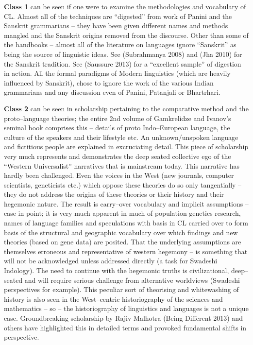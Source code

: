 \textbf{Class 1} can be seen if one were to examine the methodologies and vocabulary of CL. Almost all of the techniques are “digested” from work of Panini and the Sanskrit grammarians – they have been given different names and methods mangled and the Sanskrit origins removed from the discourse. Other than some of the handbooks – almost all of the literature on languages ignore “Sanskrit” as being the source of linguistic ideas. See (Subrahmanya 2008) and (Jha 2010) for the Sanskrit tradition. See (Saussure 2013) for a “excellent sample” of digestion in action. All the formal paradigms of Modern linguistics (which are heavily influenced by Sanskrit), chose to ignore the work of the various Indian grammarians and any discussion even of Panini, Patanjali or Bhartrhari.

\textbf{Class 2} can be seen in scholarship pertaining to the comparative method and the proto–language theories; the entire 2nd volume of Gamkrelidze and Ivanov’s seminal book comprises this – details of proto Indo–European language, the culture of the speakers and their lifestyle etc. An unknown/unspoken language and fictitious people are explained in excruciating detail. This piece of scholarship very much represents and demonstrates the deep seated collective ego of the “Western Universalist” narratives that is mainstream today. This narrative has hardly been challenged. Even the voices in the West (new journals, computer scientists, geneticists etc.) which oppose these theories do so only tangentially – they do not address the origins of these theories or their history and their hegemonic nature. The result is carry–over vocabulary and implicit assumptions – case in point; it is very much apparent in much of population genetics research, names of language families and speculations with basis in CL carried over to form basis of the structural and geographic vocabulary over which findings and new theories (based on gene data) are posited. That the underlying assumptions are themselves erroneous and representative of western hegemony – is something that will not be acknowledged unless addressed directly (a task for Swadeshi Indology). The need to continue with the hegemonic truths is civilizational, deep–seated and will require serious challenge from alternative worldviews (Swadeshi perspectives for example). This peculiar sort of theorising and whitewashing of history is also seen in the West–centric historiography of the sciences and mathematics – so – the historiography of linguistics and languages is not a unique case. Groundbreaking scholarship by Rajiv Malhotra (Being Different 2013) and others have highlighted this in detailed terms and provoked fundamental shifts in perspective.

